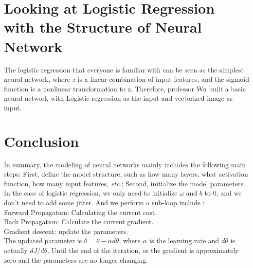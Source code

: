 \documentclass[a4paper]{article}
\begin{document}
 \section{Looking at Logistic Regression with the Structure of Neural Network}
 The logistic regression that everyone is familiar with can be seen as the simplest neural network, where $z$ is a linear combination of input features, and the sigmoid function is a nonlinear transformation to z. Therefore, professor Wu built a basic neural network with Logistic regression as the input and vectorized image as input. 
 \section{Conclusion}
 In summary, the modeling of neural networks mainly includes the following main steps: First, define the model structure, such as how many layers, what activation function, how many input features, \emph{etc.}; Second, initialize the model parameters. In the case of logistic regression, we only need to initialize $\omega$ and $b$ to 0, and we don't need to add some jitter. And we perform a sub-loop include :
 \\Forward Propagation: Calculating the current cost.
 \\ Back Propagation: Calculate the current gradient.  
 \\Gradient descent: update the parameters.
 \\ The updated parameter is $\theta=\theta−\alpha{d\theta}$, where $\alpha$ is the learning rate and $d\theta$ is actually $dJ/d\theta$. Until the end of the iteration, or the gradient is approximately zero and the parameters are no longer changing.
\end{document}
